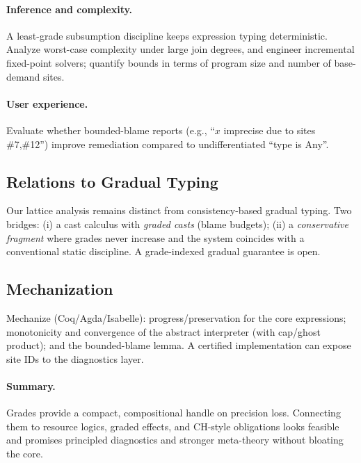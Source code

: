 \paragraph{Inference and complexity.}
A least-grade subsumption discipline keeps expression typing deterministic. Analyze worst-case complexity under large join degrees, and engineer incremental fixed-point solvers; quantify bounds in terms of program size and number of base-demand sites.

\paragraph{User experience.}
Evaluate whether bounded-blame reports (e.g., ``$x$ imprecise due to sites \#7,\#12'') improve remediation compared to undifferentiated ``type is Any''.

\subsection{Relations to Gradual Typing}
Our lattice analysis remains distinct from consistency-based gradual typing. Two bridges: (i) a cast calculus with \emph{graded casts} (blame budgets); (ii) a \emph{conservative fragment} where grades never increase and the system coincides with a conventional static discipline. A grade-indexed gradual guarantee is open.

\subsection{Mechanization}
Mechanize (Coq/Agda/Isabelle): progress/preservation for the core expressions; monotonicity and convergence of the abstract interpreter (with cap/ghost product); and the bounded-blame lemma. A certified implementation can expose site IDs to the diagnostics layer.

\paragraph{Summary.}
Grades provide a compact, compositional handle on precision loss. Connecting them to resource logics, graded effects, and CH-style obligations looks feasible and promises principled diagnostics and stronger meta-theory without bloating the core.

